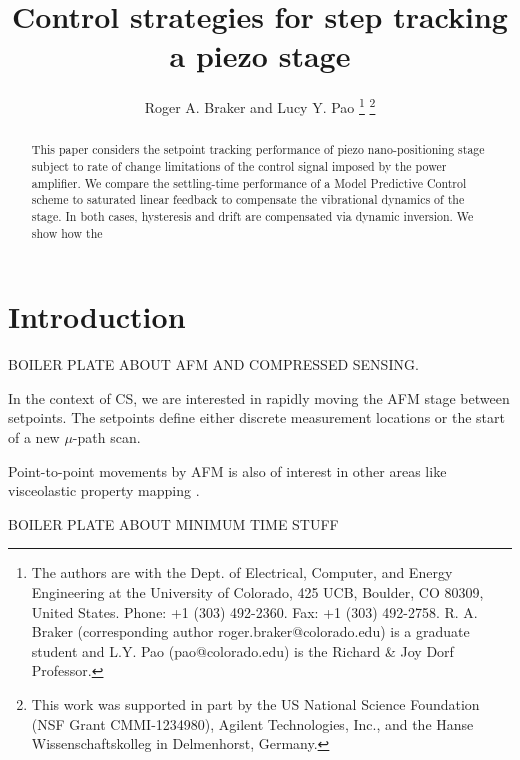 \documentclass[journal,twocolumn,twoside]{IEEEtran}
\begin{document}
\title{Control strategies for step tracking a piezo stage}
\author{Roger A. Braker and Lucy Y. Pao
  \thanks{The authors are with the Dept. of Electrical, Computer, and Energy Engineering at the University of Colorado, 425 UCB, Boulder, CO 80309, United States. Phone: +1 (303) 492-2360. Fax: +1 (303) 492-2758.
    R. A.  Braker (corresponding author roger.braker@colorado.edu) is a graduate student and
    L.Y. Pao (pao@colorado.edu) is the Richard \& Joy Dorf Professor.}
  \thanks{This work was supported in part by the US National Science Foundation (NSF Grant CMMI-1234980), Agilent Technologies, Inc., and the Hanse Wissenschaftskolleg in Delmenhorst, Germany.}
}

\maketitle
\begin{abstract}
  This paper considers the setpoint tracking performance of piezo nano-positioning stage subject to rate of change limitations of the control signal imposed by the power amplifier. We compare the settling-time performance of a Model Predictive Control scheme to saturated linear feedback to compensate the vibrational dynamics of the stage. In both cases, hysteresis and drift are compensated via dynamic inversion. We show how the 
\end{abstract}


\section{Introduction}
\label{sec:orge362f71}
BOILER PLATE ABOUT AFM AND COMPRESSED SENSING.
 \newline

In the context of CS, we are interested in rapidly moving the AFM stage between setpoints. The setpoints define either discrete measurement locations or the start of a new \(\mu\)-path scan.

Point-to-point movements by AFM is also of interest in other areas like visceolastic property mapping \cite{killgore_visceolastic_2011}.\newline

BOILER PLATE ABOUT MINIMUM TIME STUFF
\newline
\end{document}

